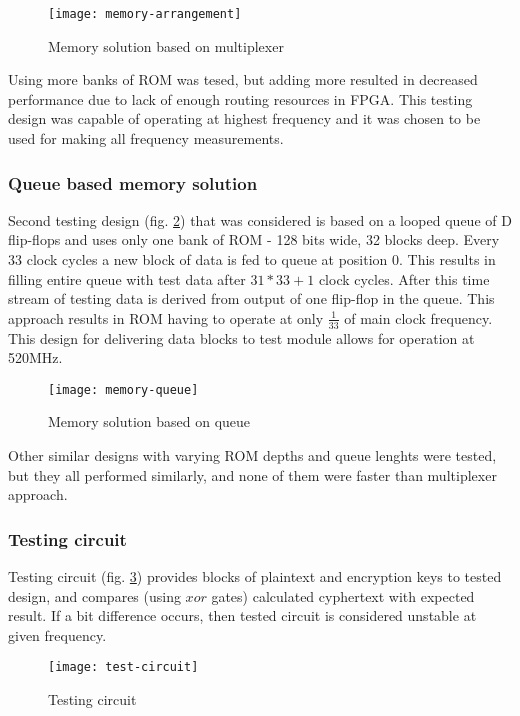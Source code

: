 \begin{figure}[!h]
\centering
\texttt{[image: memory-arrangement]}
\caption{Memory solution based on multiplexer}
\label{fig:memory-arrangement}
\end{figure}

Using more banks of ROM was tesed, but adding more resulted in decreased performance due to lack of enough routing resources in FPGA. This testing design was capable of operating at highest frequency and it was chosen to be used for making all frequency measurements.

\subsubsection{Queue based memory solution}
Second testing design (fig. \ref{fig:memory-queue}) that was considered is based on a looped queue of D flip-flops and uses only one bank of ROM - 128 bits wide, 32 blocks deep. Every 33 clock cycles a new block of data is fed to queue at position 0. This results in filling entire queue with test data after $31 * 33 + 1$ clock cycles. After this time stream of testing data is derived from output of one flip-flop in the queue. This approach results in ROM having to operate at only $\frac{1}{33}$ of main clock frequency. This design for delivering data blocks to test module allows for operation at 520MHz. 

\begin{figure}[!h]
\centering
\texttt{[image: memory-queue]}
\caption{Memory solution based on queue}
\label{fig:memory-queue}
\end{figure}

Other similar designs with varying ROM depths and queue lenghts were tested, but they all performed similarly, and none of them were faster than multiplexer approach.


\subsubsection{Testing circuit}
\label{sec:testing-circuit}
Testing circuit (fig. \ref{fig:test-circuit}) provides blocks of plaintext and encryption keys to tested design, and compares (using $xor$ gates) calculated cyphertext with expected result. If a bit difference occurs, then tested circuit is considered unstable at given frequency.

\begin{figure}[!h]
\centering
\texttt{[image: test-circuit]}
\caption{Testing circuit}
\label{fig:test-circuit}
\end{figure}


